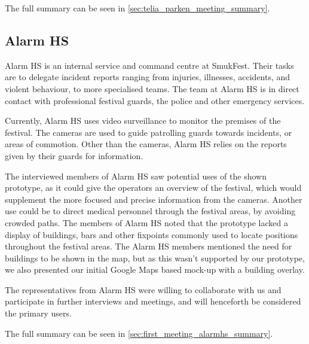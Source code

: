 The full summary can be seen in \cref{sec:telia_parken_meeting_summary}.


\subsection{Alarm HS}
Alarm HS is an internal service and command centre at SmukFest. Their tasks are to delegate incident reports ranging from injuries, illnesses, accidents, and violent behaviour, to more specialised teams. The team at Alarm HS is in direct contact with professional festival guards, the police and other emergency services. 

Currently, Alarm HS uses video surveillance to monitor the premises of the festival. The cameras are used to guide patrolling guards towards incidents, or areas of commotion. Other than the cameras, Alarm HS relies on the reports given by their guards for information.

The interviewed members of Alarm HS saw potential uses of the shown prototype, as it could give the operators an overview of the festival, which would supplement the more focused and precise information from the cameras. Another use could be to direct medical personnel through the festival areas, by avoiding crowded paths. The members of Alarm HS noted that the prototype lacked a display of buildings, bars and other fixpoints commonly used to locate positions throughout the festival areas. The Alarm HS members mentioned the need for buildings to be shown in the map, but as this wasn't supported by our prototype, we also presented our initial Google Maps based mock-up with a building overlay.

The representatives from Alarm HS were willing to collaborate with us and participate in further interviews and meetings, and will henceforth be considered the primary users.

The full summary can be seen in \cref{sec:first_meeting_alarmhs_summary}.